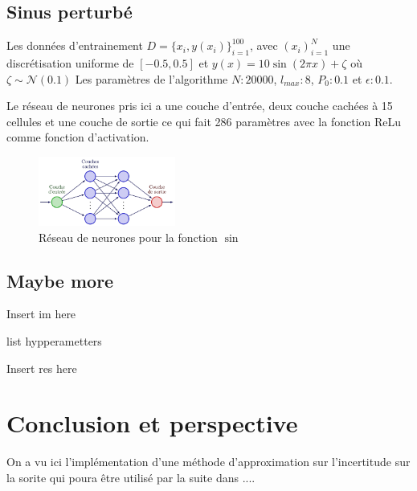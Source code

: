 \documentclass[french,12pt]{article}
\begin{document}
\subsection{Sinus perturbé}


Les données d'entrainement $D = \{x_i , y(x_i)\}_{i = 1}^{100}$, avec $(x_i)_{i = 1}^N$
une discrétisation uniforme de $[-0.5, 0.5]$ et $y(x) = 10 \sin(2 \pi x) + \zeta$ où $\zeta \sim \mathcal{N}(0.1)$
Les paramètres de l'algorithme $N : 20000$, $l_{max} : 8$, $P_0 : 0.1$ et $\epsilon : 0.1$.

Le réseau de neurones pris ici a une couche d'entrée, deux couche cachées à 15 cellules et une couche de sortie ce qui
fait 286 paramètres avec la fonction ReLu comme fonction d'activation.


\begin{figure}[H]
    \centering
    \includegraphics[width = 0.4\textwidth]{FNN/Images/fnnSin/fnnSin_page-0001.jpg}
    \caption[short]{Réseau de neurones pour la fonction $\sin$}
\end{figure}


\subsection{Maybe more}

Insert im here

list hypperametters

Insert res here


\pagebreak
\section{Conclusion et perspective}
On a vu ici l'implémentation d'une méthode d'approximation sur l'incertitude
sur la sorite qui poura être utilisé par la suite dans ....

\pagebreak


\end{document}
